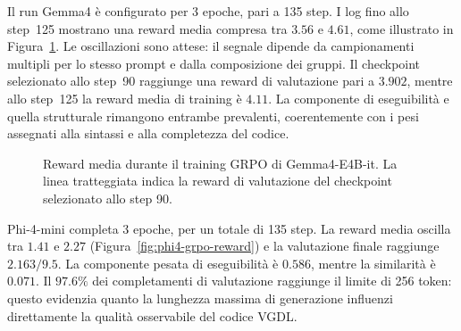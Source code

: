 \documentclass[final,5p,times,twocolumn]{elsarticle}
\begin{document}
Il run Gemma4 è configurato per 3 epoche, pari a 135 step. I log fino allo step~125 mostrano una reward media compresa tra $3.56$ e $4.61$, come illustrato in Figura~\ref{fig:gemma4-grpo-reward}. Le oscillazioni sono attese: il segnale dipende da campionamenti multipli per lo stesso prompt e dalla composizione dei gruppi. Il checkpoint selezionato allo step~90 raggiunge una reward di valutazione pari a $3.902$, mentre allo step~125 la reward media di training è $4.11$. La componente di eseguibilità e quella strutturale rimangono entrambe prevalenti, coerentemente con i pesi assegnati alla sintassi e alla completezza del codice.

\begin{figure}[t]
  \centering
  \caption{Reward media durante il training GRPO di Gemma4-E4B-it. La linea tratteggiata indica la reward di valutazione del checkpoint selezionato allo step 90.}
  \label{fig:gemma4-grpo-reward}
\end{figure}

Phi-4-mini completa 3 epoche, per un totale di 135 step. La reward media oscilla tra $1.41$ e $2.27$ (Figura~\ref{fig:phi4-grpo-reward}) e la valutazione finale raggiunge $2.163/9.5$. La componente pesata di eseguibilità è $0.586$, mentre la similarità è $0.071$. Il $97.6\%$ dei completamenti di valutazione raggiunge il limite di 256 token: questo evidenzia quanto la lunghezza massima di generazione influenzi direttamente la qualità osservabile del codice VGDL.
\end{document}
